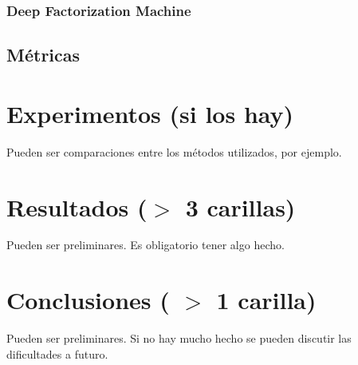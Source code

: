 \documentclass[11pt,a4paper,twoside]{thesis}
\begin{document}
\subsection{Deep Factorization Machine}

\section{Métricas}

\chapter{Experimentos (si los hay)}
Pueden ser comparaciones entre los métodos utilizados, por ejemplo. 

\chapter{Resultados ($>$ 3 carillas)}

Pueden ser preliminares. Es obligatorio tener algo hecho.


\chapter{Conclusiones ( $>$ 1 carilla)} 

Pueden ser preliminares. 
Si no hay mucho hecho se pueden discutir las dificultades a futuro.


\backmatter
%
\end{document}
